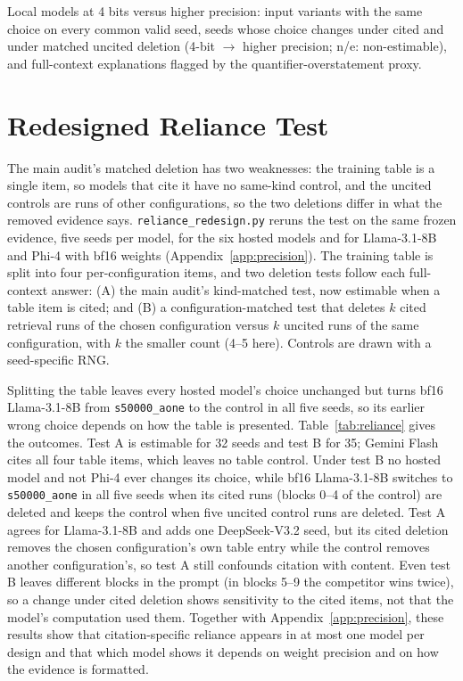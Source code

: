\begin{table}[h]
\centering\footnotesize\setlength{\tabcolsep}{3pt}
\caption{Local models at 4 bits versus higher precision: input variants with the same choice on every common valid seed, seeds whose choice changes under cited and under matched uncited deletion (4-bit $\to$ higher precision; n/e: non-estimable), and full-context explanations flagged by the quantifier-overstatement proxy.}
\label{tab:precision}
\begin{adjustbox}{max width=\columnwidth}

\end{adjustbox}
\end{table}

\section{Redesigned Reliance Test}
\label{app:reliance}
The main audit's matched deletion has two weaknesses: the training table is a single item, so models that cite it have no same-kind control, and the uncited controls are runs of other configurations, so the two deletions differ in what the removed evidence says. \texttt{reliance\_redesign.py} reruns the test on the same frozen evidence, five seeds per model, for the six hosted models and for Llama-3.1-8B and Phi-4 with bf16 weights (Appendix~\ref{app:precision}). The training table is split into four per-configuration items, and two deletion tests follow each full-context answer: (A) the main audit's kind-matched test, now estimable when a table item is cited; and (B) a configuration-matched test that deletes $k$ cited retrieval runs of the chosen configuration versus $k$ uncited runs of the same configuration, with $k$ the smaller count (4--5 here). Controls are drawn with a seed-specific RNG.

Splitting the table leaves every hosted model's choice unchanged but turns bf16 Llama-3.1-8B from \texttt{s50000\_aone} to the control in all five seeds, so its earlier wrong choice depends on how the table is presented. Table~\ref{tab:reliance} gives the outcomes. Test A is estimable for 32 seeds and test B for 35; Gemini Flash cites all four table items, which leaves no table control. Under test B no hosted model and not Phi-4 ever changes its choice, while bf16 Llama-3.1-8B switches to \texttt{s50000\_aone} in all five seeds when its cited runs (blocks 0--4 of the control) are deleted and keeps the control when five uncited control runs are deleted. Test A agrees for Llama-3.1-8B and adds one DeepSeek-V3.2 seed, but its cited deletion removes the chosen configuration's own table entry while the control removes another configuration's, so test A still confounds citation with content. Even test B leaves different blocks in the prompt (in blocks 5--9 the competitor wins twice), so a change under cited deletion shows sensitivity to the cited items, not that the model's computation used them. Together with Appendix~\ref{app:precision}, these results show that citation-specific reliance appears in at most one model per design and that which model shows it depends on weight precision and on how the evidence is formatted.

